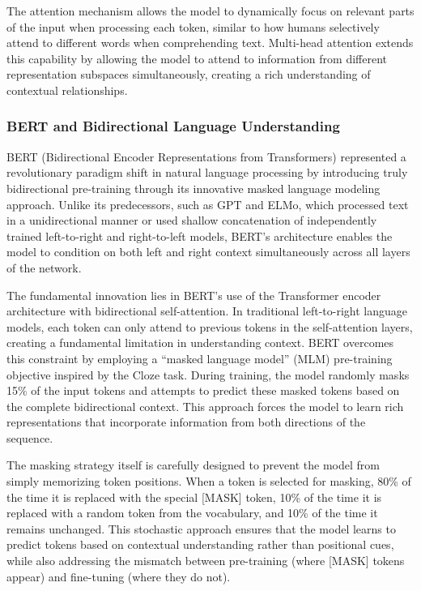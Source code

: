 \documentclass[
  titlepage]{article}
\begin{document}
The attention mechanism allows the model to dynamically focus on
relevant parts of the input when processing each token, similar to how
humans selectively attend to different words when comprehending text.
Multi-head attention extends this capability by allowing the model to
attend to information from different representation subspaces
simultaneously, creating a rich understanding of contextual
relationships.

\subsubsection{BERT and Bidirectional Language
Understanding}\label{bert-and-bidirectional-language-understanding}

BERT (Bidirectional Encoder Representations from Transformers)
represented a revolutionary paradigm shift in natural language
processing by introducing truly bidirectional pre-training through its
innovative masked language modeling approach. Unlike its predecessors,
such as GPT and ELMo, which processed text in a unidirectional manner or
used shallow concatenation of independently trained left-to-right and
right-to-left models, BERT's architecture enables the model to condition
on both left and right context simultaneously across all layers of the
network.

The fundamental innovation lies in BERT's use of the Transformer encoder
architecture with bidirectional self-attention. In traditional
left-to-right language models, each token can only attend to previous
tokens in the self-attention layers, creating a fundamental limitation
in understanding context. BERT overcomes this constraint by employing a
``masked language model'' (MLM) pre-training objective inspired by the
Cloze task. During training, the model randomly masks 15\% of the input
tokens and attempts to predict these masked tokens based on the complete
bidirectional context. This approach forces the model to learn rich
representations that incorporate information from both directions of the
sequence.

The masking strategy itself is carefully designed to prevent the model
from simply memorizing token positions. When a token is selected for
masking, 80\% of the time it is replaced with the special {[}MASK{]}
token, 10\% of the time it is replaced with a random token from the
vocabulary, and 10\% of the time it remains unchanged. This stochastic
approach ensures that the model learns to predict tokens based on
contextual understanding rather than positional cues, while also
addressing the mismatch between pre-training (where {[}MASK{]} tokens
appear) and fine-tuning (where they do not).
\end{document}
